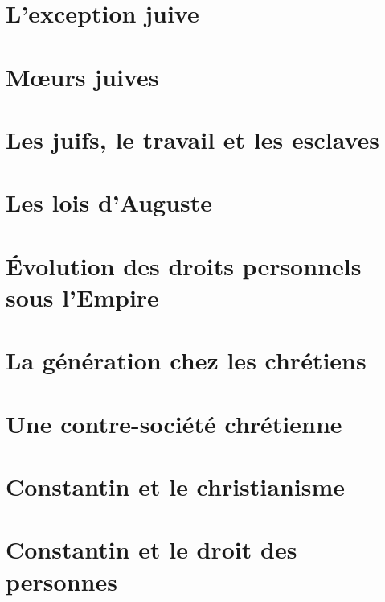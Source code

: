 \documentclass[12pt,french]{book}
\begin{document}
\chapter{L'exception juive}


\chapter{Mœurs juives}


\chapter{Les juifs, le travail et les esclaves}


\chapter{Les lois d'Auguste}


\chapter[Évolution des droits personnels sous l'Empire]{Évolution des droits personnels\\sous l'Empire}


\chapter{La génération chez les chrétiens}


\chapter{Une contre-société chrétienne}


\chapter{Constantin et le christianisme}


\chapter{Constantin et le droit des personnes}

\end{document}

